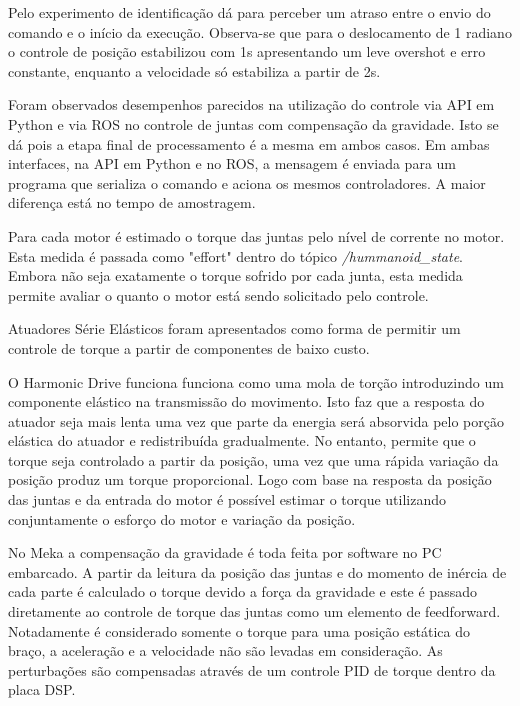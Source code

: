 Pelo experimento de identificação dá para perceber um atraso entre o envio do comando e o início da execução. Observa-se que para o deslocamento de 1 radiano o controle de posição estabilizou com 1s apresentando um leve overshot e erro constante, enquanto a velocidade só estabiliza a partir de 2s.

Foram observados desempenhos parecidos na utilização do controle via API em Python e via ROS no controle de juntas com compensação da gravidade. Isto se dá pois a etapa final de processamento é a mesma em ambos casos. Em ambas interfaces, na API em Python e no ROS, a mensagem é enviada para um programa que serializa o comando e aciona os mesmos controladores. A maior diferença está no tempo de amostragem.

Para cada motor é estimado o torque das juntas pelo nível de corrente no motor. Esta medida é passada como "effort" dentro do tópico \textit{/hummanoid_state}. Embora não seja exatamente o torque sofrido por cada junta, esta medida permite avaliar o quanto o motor está sendo solicitado pelo controle.

Atuadores Série Elásticos foram apresentados como forma de permitir um controle de torque a partir de componentes de baixo custo. 

O Harmonic Drive funciona funciona como uma mola de torção introduzindo um componente elástico na transmissão do movimento. Isto faz que a resposta do atuador seja mais lenta uma vez que parte da energia será absorvida pelo porção elástica do atuador e redistribuída gradualmente. No entanto, permite que o torque seja controlado a partir da posição, uma vez que uma rápida variação da posição produz um torque proporcional. Logo com base na resposta da posição das juntas e da entrada do motor é possível estimar o torque utilizando conjuntamente o esforço do motor e variação da posição.

No Meka a compensação da gravidade é toda feita por software no PC embarcado. A partir da leitura da posição das juntas e do momento de inércia de cada parte é calculado o torque devido a força da gravidade e este é passado diretamente ao controle de torque das juntas como um elemento de feedforward. Notadamente é considerado somente o torque para uma posição estática do braço, a aceleração e a velocidade não são levadas em consideração. As perturbações são compensadas através de um controle PID de torque dentro da placa DSP.


